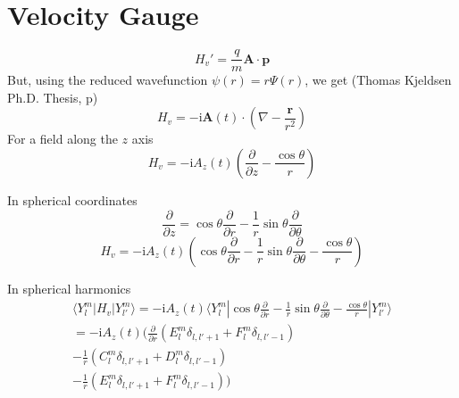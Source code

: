 \documentclass[a4paper,12pt]{paper}
\newcommand{\matelem}[3]{\langle #1 | #2 | #3 \rangle}
\renewcommand{\imath}{{\mathrm i}}
\newcommand{\partialdiff}[2]{\frac{\partial #1}{\partial #2}}
\renewcommand{\vec}[1]{\ensuremath{\textbf{#1}}}
\begin{document}
\section{Velocity Gauge}

\begin{equation}
 	H_v' = \frac{q}{m} \vec{A} \cdot \vec{p}
\end{equation}
But, using the reduced wavefunction $\psi(r) = r \Psi(r)$, we get (Thomas
Kjeldsen Ph.D. Thesis, p)
\begin{equation}
 	H_v = -\imath \vec{A}(t) \cdot (\nabla - \frac{\vec{r}}{r^2})
\end{equation}
For a field along the $z$ axis
\begin{equation}
 	H_v = -\imath A_z(t) \left( \partialdiff{}{z} - \frac{\cos \theta}{r}
\right)
\end{equation}

In spherical coordinates 
\begin{equation}
 	\partialdiff{}{z} = 
		\cos \theta \partialdiff{}{r} 
		- \frac{1}{r} \sin \theta \partialdiff{}{\theta}
\end{equation}
\begin{equation}
 	H_v = -\imath A_z(t) \left( 
		\cos \theta \partialdiff{}{r} 
		- \frac{1}{r} \sin \theta \partialdiff{}{\theta} 
		- \frac{\cos \theta}{r}
		\right)
\end{equation}

In spherical harmonics
\begin{eqnarray}
 	\matelem{Y_l^m}{H_v}{Y_{l'}^m} = -\imath A_z(t)
 	\matelem
	{Y_l^m}
	{ 
	\cos \theta \partialdiff{}{r} 
	- \frac{1}{r} \sin \theta \partialdiff{}{\theta} 
	- \frac{\cos \theta}{r}
	}
	{Y_{l'}^m}
	\\ = 
	-\imath A_z(t)
	(
	\partialdiff{}{r} (E_l^m \delta_{l,l'+1} + F_l^m \delta_{l,l'-1}) \\
	- \frac{1}{r} (C_l^m \delta_{l,l'+1} + D_l^m \delta_{l,l'-1}) \\
	- \frac{1}{r} (E_l^m \delta_{l,l'+1} + F_l^m \delta_{l,l'-1})
	)
\end{eqnarray}
\end{document}
